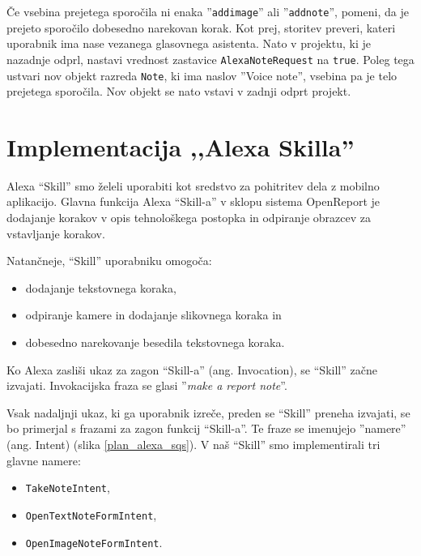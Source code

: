 \documentclass[a4paper, 12pt]{book}
\begin{document}
Če vsebina prejetega sporočila ni enaka ''\texttt{addimage}'' ali ''\texttt{addnote}'', pomeni, da je prejeto sporočilo dobesedno narekovan korak.
Kot prej, storitev preveri, kateri uporabnik ima nase vezanega glasovnega asistenta.
Nato v projektu, ki je nazadnje odprl, nastavi vrednost zastavice \texttt{AlexaNoteRequest} na \texttt{true}.
Poleg tega ustvari nov objekt razreda \texttt{Note}, ki ima naslov ''Voice note'', vsebina pa je telo prejetega sporočila.
Nov objekt se nato vstavi v zadnji odprt projekt.



\section{Implementacija ,,Alexa Skilla''}

Alexa \enquote{Skill} smo želeli uporabiti kot sredstvo za pohitritev dela z mobilno aplikacijo.
Glavna funkcija Alexa \enquote{Skill-a} v sklopu sistema OpenReport je dodajanje korakov v opis tehnološkega postopka in odpiranje obrazcev za vstavljanje korakov.

\noindent Natančneje, \enquote{Skill} uporabniku omogoča:
\begin{itemize}
	\item dodajanje tekstovnega koraka,
	\item odpiranje kamere in dodajanje slikovnega koraka in
	\item dobesedno narekovanje besedila tekstovnega koraka.
\end{itemize}




Ko Alexa zasliši ukaz za zagon \enquote{Skill-a} (ang. Invocation), se \enquote{Skill} začne izvajati.
Invokacijska fraza se glasi ''\textit{make a report note}''.

Vsak nadaljnji ukaz, ki ga uporabnik izreče, preden se \enquote{Skill} preneha izvajati, se bo primerjal s frazami za zagon funkcij \enquote{Skill-a}.
Te fraze se imenujejo ''namere'' (ang. Intent) (slika \ref{plan_alexa_sqs}).
V naš \enquote{Skill} smo implementirali tri glavne namere:

\begin{itemize}
	\item \texttt{TakeNoteIntent},
	\item \texttt{OpenTextNoteFormIntent},
	\item \texttt{OpenImageNoteFormIntent}.
\end{itemize}
\end{document}
